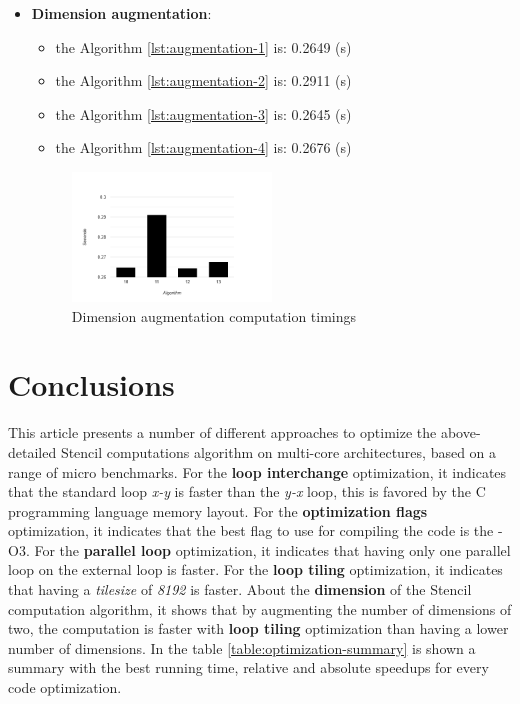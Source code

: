 \documentclass[conference]{IEEEtran}
\begin{document}
\begin{itemize}
	\item \textbf{Dimension augmentation}: 
	\begin{itemize}
		\item the Algorithm \ref{lst:augmentation-1} is: 0.2649 (s)
		\item the Algorithm \ref{lst:augmentation-2} is: 0.2911 (s)
		\item the Algorithm \ref{lst:augmentation-3} is: 0.2645 (s)
		\item the Algorithm \ref{lst:augmentation-4} is: 0.2676 (s)
	\end{itemize}	
	\begin{figure}[htbp]
		\centering
			\includegraphics[width=0.50\textwidth]{dimension-augmentation.png}
		\caption{Dimension augmentation computation timings}
		\label{fig:dimension-augmentation}
	\end{figure}
\end{itemize}

\section{Conclusions}
This article presents a number of different approaches to optimize the above-detailed Stencil computations algorithm on multi-core architectures, based on a range of micro benchmarks.
For the \textbf{loop interchange} optimization, it indicates that the standard loop \textit{x-y} is faster than the \textit{y-x} loop, this is favored by the C programming language memory layout.
For the \textbf{optimization flags} optimization, it indicates that the best flag to use for compiling the code is the -O3.
For the \textbf{parallel loop} optimization, it indicates that having only one parallel loop on the external loop is faster.
For the \textbf{loop tiling} optimization, it indicates that having a \textit{tile\textunderscore size} of \textit{8192} is faster.
About the \textbf{dimension} of the Stencil computation algorithm, it shows that by augmenting the number of dimensions of two, the computation is faster with \textbf{loop tiling} optimization than having a lower number of dimensions. In the table \ref{table:optimization-summary} is shown a summary with the best running time, relative and absolute speedups for every code optimization.
\end{document}
